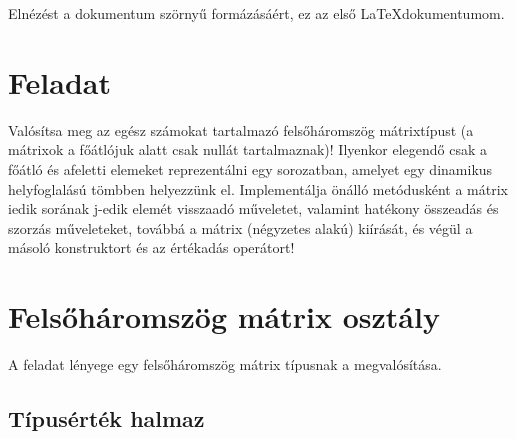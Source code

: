 \documentclass[a4paper,12pt,twopage]{book}
\begin{document}
Elnézést a dokumentum szörnyű formázásáért, ez az első \LaTeX dokumentumom.

\tableofcontents

\chapter{Feladat}

Valósítsa meg az egész számokat tartalmazó felsőháromszög mátrixtípust (a mátrixok a főátlójuk alatt csak nullát tartalmaznak)! Ilyenkor elegendő csak a főátló és afeletti elemeket reprezentálni egy sorozatban, amelyet egy dinamikus helyfoglalású tömbben helyezzünk el. Implementálja önálló metódusként a mátrix iedik sorának j-edik elemét visszaadó műveletet, valamint hatékony összeadás és szorzás műveleteket, továbbá a mátrix (négyzetes alakú) kiírását, és végül a másoló konstruktort és az értékadás operátort!

\chapter{Felsőháromszög mátrix osztály}

A feladat lényege egy felsőháromszög mátrix típusnak a megvalósítása.

\section{Típusérték halmaz}
\end{document}

